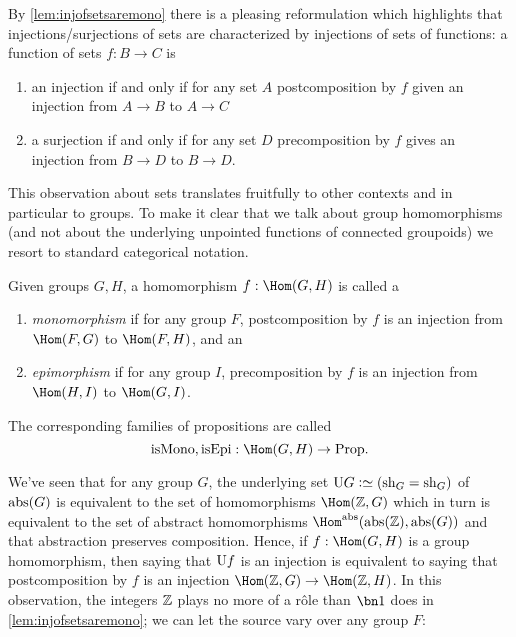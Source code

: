 By \cref{lem:injofsetsaremono} there is a pleasing reformulation which highlights that injections/surjections of sets are characterized by injections of sets of functions: a function of sets $f:B\to C$ is
\begin{enumerate}
\item  an injection if and only if for any set $A$ postcomposition by $f$ given an injection from $A\to B$ to $A\to C$
\item a surjection if and only if for any set $D$ precomposition by $f$ gives an injection from $B\to D$ to $B\to D$.
\end{enumerate}

This observation about sets translates fruitfully to other contexts and in particular to groups.  To make it clear that we talk about group homomorphisms (and not about the underlying unpointed functions of connected groupoids) we resort to standard categorical notation.
\begin{definition}\label{def:monomorphism}
Given groups $G,H$, a homomorphism $f: \Hom(G,H)$ is called a\label{def:epimorphism}
\begin{enumerate}
\item \emph{monomorphism} if for any group $F$,
  postcomposition by $f$ is an injection from $\Hom(F,G)$ to $\Hom(F,H)$, and an
\item \emph{epimorphism} if for any group $I$,
  precomposition by $f$ is an injection from $\Hom(H,I)$ to $\Hom(G,I)$.
\end{enumerate}
The corresponding families of propositions are called
$$\ismono,\isepi:\Hom(G,H)\to\Prop.$$
\end{definition}

We've seen that for any group $G$, the underlying set $\USym G\defequi(\shape_G=\shape_G)$ of $\mathrm{abs}(G)$ is equivalent to the set of homomorphisms $\Hom(\ZZ,G)$ which in turn is equivalent to the set of abstract homomorphisms $\Hom^{\abstr}(\abstr(\ZZ),\abstr(G))$ and that abstraction preserves composition.
Hence, if $f:\Hom(G,H)$ is a group homomorphism, then saying that
$\mathrm{U} f$ is an injection is equivalent to saying that postcomposition by $f$ is an injection $\Hom(\ZZ,G)\to\Hom(\ZZ,H)$.
In this observation, the integers $\mathbb{Z}$ plays no more of a r\^ole than $\bn 1$ does in \cref{lem:injofsetsaremono}; we can let the source vary over any group $F$:


